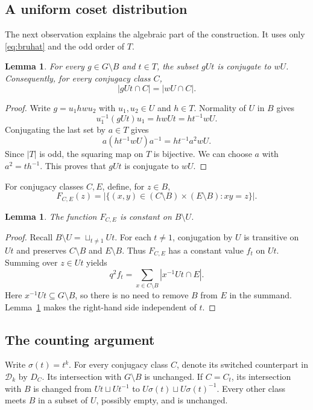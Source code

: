 \documentclass[11pt]{amsart}
\numberwithin{equation}{section}
\newtheorem{lemma}[theorem]{Lemma}
\theoremstyle{definition}
\theoremstyle{remark}
\newcommand{\D}{\mathcal D}
\begin{document}
\subsection{A uniform coset distribution}

The next observation explains the algebraic part of the construction.
It uses only \eqref{eq:bruhat} and the odd order of $T$.

\begin{lemma}\label{lem:uniform}
For every $g\in G\setminus B$ and $t\in T$, the subset $gUt$ is conjugate to $wU$. Consequently, for every conjugacy class $C$,
\begin{equation}\label{eq:uniform}
 |gUt\cap C|=|wU\cap C|.
\end{equation}
\end{lemma}
\begin{proof}
Write $g=u_1hw u_2$ with $u_1,u_2\in U$ and $h\in T$.
Normality of $U$ in $B$ gives
\[
 u_1^{-1}(gUt)u_1=hwUt=ht^{-1}wU.
\]
Conjugating the last set by $a\in T$ gives
\[
 a(ht^{-1}wU)a^{-1}=ht^{-1}a^2wU.
\]
Since $|T|$ is odd, the squaring map on \(T\) is bijective. We can choose $a$ with $a^2=th^{-1}$. This proves that $gUt$ is conjugate to $wU$.
\end{proof}

For conjugacy classes $C,E$, define, for $z\in B$,
\[
 F_{C,E}(z)=
 |\{(x,y)\in(C\setminus B)\times(E\setminus B):xy=z\}|.
\]

\begin{lemma}\label{lem:outside-product}
The function $F_{C,E}$ is constant on $B\setminus U$.
\end{lemma}
\begin{proof}
Recall $B\setminus U = \sqcup_{t\ne 1} Ut$. For each $t\ne1$, conjugation by $U$ is transitive on $Ut$ and
preserves $C\setminus B$ and $E\setminus B$. Thus $F_{C,E}$ has a
constant value $f_t$ on $Ut$. Summing over $z\in Ut$ yields
\[
 q^2f_t=\sum_{x\in C\setminus B}|x^{-1}Ut\cap E|.
\]
Here $x^{-1}Ut\subseteq G\setminus B$, so there is no need to remove $B$ from $E$ in the summand. 
Lemma~\ref{lem:uniform} makes the right-hand side independent of $t$.
\end{proof}

\subsection{The counting argument}

Write $\sigma(t)=t^k$. For every conjugacy class $C$, denote its switched counterpart in $\D_k$ by $D_C$. 
Its intersection with $G\setminus B$ is unchanged.
If $C=C_t$, its intersection with $B$ is changed from
$Ut\sqcup U{t^{-1}}$ to $U{\sigma(t)}\sqcup U{\sigma(t)^{-1}}$.
Every other class meets $B$ in a subset of $U$, possibly empty, and is
unchanged.
\end{document}
